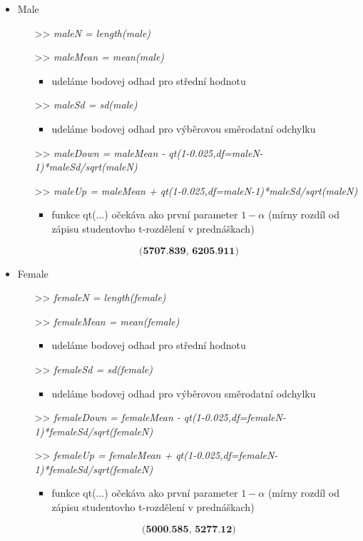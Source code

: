 \documentclass[paper=a4, fontsize=12pt]{scrartcl}
\numberwithin{equation}{section}		%
\numberwithin{figure}{section}			%
\numberwithin{table}{section}				%
\begin{document}
\begin{itemize}
	\item Male
	\begin{itemize}
		\item[>>]\textit{ maleN = length(male)}
		\item[>>]\textit{ maleMean = mean(male)}
		\begin{itemize}
			\item udeláme bodovej odhad pro střední hodnotu	
		\end{itemize}
		\item[>>]\textit{ maleSd = sd(male)}
		\begin{itemize}
			\item udeláme bodovej odhad pro výběrovou směrodatní odchylku 
		\end{itemize}
		\item[>>]\textit{maleDown = maleMean - qt(1-0.025,df=maleN-1)*maleSd/sqrt(maleN)} 
		\item[>>]\textit{ maleUp = maleMean + qt(1-0.025,df=maleN-1)*maleSd/sqrt(maleN)}
		\begin{itemize}
			\item funkce qt(...) očekáva ako první parameter \(1 - \alpha\) (mírny rozdíl od zápisu studentovho t-rozdělení v prednáškach)    
		\end{itemize}
	\end{itemize}
	
	\[
	 \textbf{(5707.839, 6205.911)}
	\]

	\item Female
	\begin{itemize}
	\item[>>]\textit{ femaleN = length(female)}
	\item[>>]\textit{ femaleMean = mean(female)}
	\begin{itemize}
		\item udeláme bodovej odhad pro střední hodnotu	
	\end{itemize}
	\item[>>]\textit{ femaleSd = sd(female)}
	\begin{itemize}
		\item udeláme bodovej odhad pro výběrovou směrodatní odchylku 
	\end{itemize}
	\item[>>]\textit{femaleDown = femaleMean - qt(1-0.025,df=femaleN-1)*femaleSd/sqrt(femaleN)} 
	\item[>>]\textit{ femaleUp = femaleMean + qt(1-0.025,df=femaleN-1)*femaleSd/sqrt(femaleN)}
	\begin{itemize}
		\item funkce qt(...) očekáva ako první parameter \(1 - \alpha\) (mírny rozdíl od zápisu studentovho t-rozdělení v prednáškach)    
	\end{itemize}
\end{itemize}

\[
\textbf{(5000.585, 5277.12)}
\]
\end{itemize}
\end{document}

